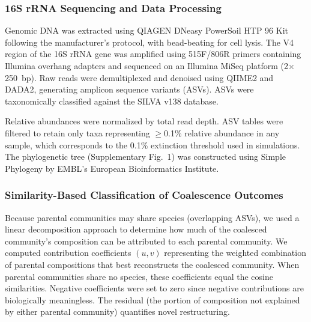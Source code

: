 \subsubsection*{16S rRNA Sequencing and Data Processing}
\label{sec:suppl:methods:sequencing}

Genomic DNA was extracted using QIAGEN DNeasy PowerSoil HTP 96 Kit following the manufacturer's protocol, with bead-beating for cell lysis. The V4 region of the 16S rRNA gene was amplified using 515F/806R primers containing Illumina overhang adapters and sequenced on an Illumina MiSeq platform (2$\times$250~bp). Raw reads were demultiplexed and denoised using QIIME2 and DADA2, generating amplicon sequence variants (ASVs). ASVs were taxonomically classified against the SILVA v138 database.

Relative abundances were normalized by total read depth. ASV tables were filtered to retain only taxa representing $\geq$0.1\% relative abundance in any sample, which corresponds to the 0.1\% extinction threshold used in simulations. The phylogenetic tree (Supplementary Fig.~1) was constructed using Simple Phylogeny by EMBL's European Bioinformatics Institute\citep{Madeira2022}.


\subsubsection*{Similarity-Based Classification of Coalescence Outcomes}
\label{sec:suppl:classification}


Because parental communities may share species (overlapping ASVs), we used a linear decomposition approach to determine how much of the coalesced community's composition can be attributed to each parental community. We computed contribution coefficients $(u, v)$ representing the weighted combination of parental compositions that best reconstructs the coalesced community. When parental communities share no species, these coefficients equal the cosine similarities. Negative coefficients were set to zero since negative contributions are biologically meaningless. The residual (the portion of composition not explained by either parental community) quantifies novel restructuring.

